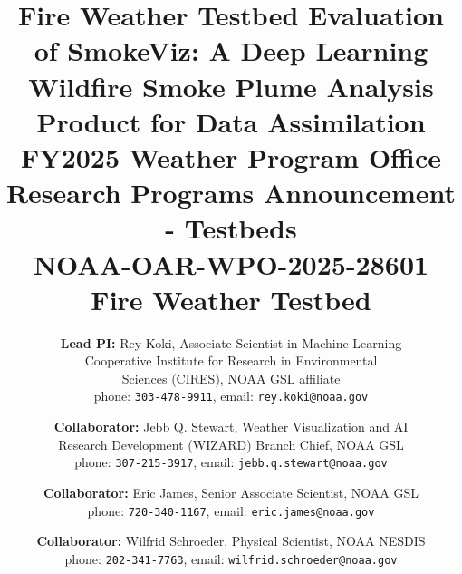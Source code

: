 \documentclass[12pt,onecolumn,letterpaper]{article}
\title{Fire Weather Testbed Evaluation of SmokeViz: A Deep Learning Wildfire Smoke Plume Analysis Product for Data Assimilation \\ \small FY2025 Weather Program Office Research Programs Announcement - Testbeds \\ \small NOAA-OAR-WPO-2025-28601 \\ Fire Weather Testbed}
\author{\textbf{Lead PI:} Rey Koki, Associate Scientist in Machine Learning\\
Cooperative Institute for Research in Environmental\\
Sciences (CIRES), NOAA GSL affiliate\\
phone: {\tt\small 303-478-9911}, email: {\tt\small rey.koki@noaa.gov}
\and
\textbf{Collaborator:} Jebb Q. Stewart, Weather Visualization and AI\\
Research Development (WIZARD) Branch Chief, NOAA GSL\\
phone: {\tt\small 307-215-3917}, email: {\tt\small jebb.q.stewart@noaa.gov}
\and
\textbf{Collaborator:} Eric James, Senior Associate Scientist, NOAA GSL\\
phone: {\tt\small 720-340-1167}, email: {\tt\small eric.james@noaa.gov}
\and
\textbf{Collaborator:} Wilfrid Schroeder, Physical Scientist, NOAA NESDIS\\
phone: {\tt\small 202-341-7763}, email: {\tt\small wilfrid.schroeder@noaa.gov}
}
\begin{document}
\maketitle
\pagebreak

\pagebreak


{
    \small
    
%    
    
}

% 
\end{document}

